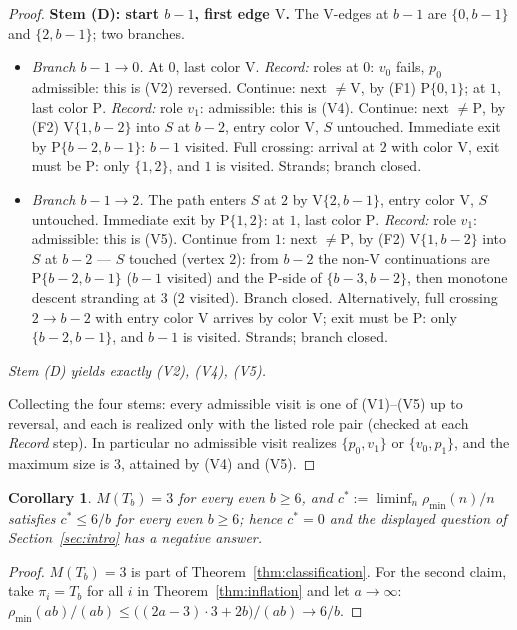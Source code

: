 \documentclass[11pt]{article}
\newtheorem{corollary}[theorem]{Corollary}
\theoremstyle{definition}
\newcommand{\pmin}{\rho_{\min}}
\begin{document}
\begin{proof}
\medskip
\noindent\textbf{Stem (D): start $b-1$, first edge $\mathrm V$.}
The V-edges at $b-1$ are $\{0, b-1\}$ and $\{2, b-1\}$; two branches.
\begin{itemize}
\item \emph{Branch $b-1 \to 0$.} At $0$, last color $\mathrm V$. \emph{Record:}
roles at $0$: $v_0$ fails, $p_0$ admissible: this is (V2) reversed. Continue: next
$\ne \mathrm V$, by (F1) $\mathrm P\{0,1\}$; at $1$, last color $\mathrm P$.
\emph{Record:} role $v_1$: admissible: this is (V4). Continue: next $\ne \mathrm P$,
by (F2) $\mathrm V\{1,b-2\}$ into $S$ at $b-2$, entry color $\mathrm V$, $S$
untouched. Immediate exit by $\mathrm P\{b-2,b-1\}$: $b-1$ visited. Full crossing:
arrival at $2$ with color $\mathrm V$, exit must be $\mathrm P$: only $\{1,2\}$, and
$1$ is visited. Strands; branch closed.
\item \emph{Branch $b-1 \to 2$.} The path enters $S$ at $2$ by
$\mathrm V\{2,b-1\}$, entry color $\mathrm V$, $S$ untouched. Immediate exit by
$\mathrm P\{1,2\}$: at $1$, last color $\mathrm P$. \emph{Record:} role $v_1$:
admissible: this is (V5). Continue from $1$: next $\ne \mathrm P$, by (F2)
$\mathrm V\{1,b-2\}$ into $S$ at $b-2$ --- $S$ touched (vertex $2$): from $b-2$ the
non-$\mathrm V$ continuations are $\mathrm P\{b-2,b-1\}$ ($b-1$ visited) and the
P-side of $\{b-3,b-2\}$, then monotone descent stranding at $3$ ($2$ visited).
Branch closed. Alternatively, full crossing $2 \to b-2$ with entry color $\mathrm V$
arrives by color $\mathrm V$; exit must be $\mathrm P$: only $\{b-2,b-1\}$, and
$b-1$ is visited. Strands; branch closed.
\end{itemize}
\emph{Stem (D) yields exactly (V2), (V4), (V5).}

\medskip
Collecting the four stems: every admissible visit is one of (V1)--(V5) up to
reversal, and each is realized only with the listed role pair (checked at each
\emph{Record} step). In particular no admissible visit realizes $\{p_0, v_1\}$ or
$\{v_0, p_1\}$, and the maximum size is $3$, attained by (V4) and (V5).
\end{proof}

\begin{corollary}\label{cor:M3}
$M(T_b) = 3$ for every even $b \ge 6$, and $c^* := \liminf_n \pmin(n)/n$ satisfies
$c^* \le 6/b$ for every even $b \ge 6$; hence $c^* = 0$ and the displayed question
of Section~\ref{sec:intro} has a negative answer.
\end{corollary}

\begin{proof}
$M(T_b) = 3$ is part of Theorem~\ref{thm:classification}. For the second claim, take
$\pi_i = T_b$ for all $i$ in Theorem~\ref{thm:inflation} and let $a \to \infty$:
$\pmin(ab)/(ab) \le \bigl((2a-3)\cdot 3 + 2b\bigr)/(ab) \to 6/b$.
\end{proof}
\end{document}
